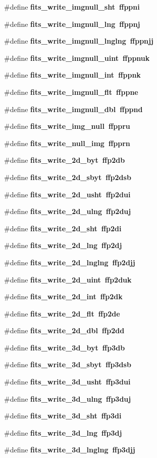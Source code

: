 \begin{CompactItemize}
\#define \bf{fits\_\-write\_\-imgnull\_\-sht}~ffppni
\item 
\#define \bf{fits\_\-write\_\-imgnull\_\-lng}~ffppnj
\item 
\#define \bf{fits\_\-write\_\-imgnull\_\-lnglng}~ffppnjj
\item 
\#define \bf{fits\_\-write\_\-imgnull\_\-uint}~ffppnuk
\item 
\#define \bf{fits\_\-write\_\-imgnull\_\-int}~ffppnk
\item 
\#define \bf{fits\_\-write\_\-imgnull\_\-flt}~ffppne
\item 
\#define \bf{fits\_\-write\_\-imgnull\_\-dbl}~ffppnd
\item 
\#define \bf{fits\_\-write\_\-img\_\-null}~ffppru
\item 
\#define \bf{fits\_\-write\_\-null\_\-img}~ffpprn
\item 
\#define \bf{fits\_\-write\_\-2d\_\-byt}~ffp2db
\item 
\#define \bf{fits\_\-write\_\-2d\_\-sbyt}~ffp2dsb
\item 
\#define \bf{fits\_\-write\_\-2d\_\-usht}~ffp2dui
\item 
\#define \bf{fits\_\-write\_\-2d\_\-ulng}~ffp2duj
\item 
\#define \bf{fits\_\-write\_\-2d\_\-sht}~ffp2di
\item 
\#define \bf{fits\_\-write\_\-2d\_\-lng}~ffp2dj
\item 
\#define \bf{fits\_\-write\_\-2d\_\-lnglng}~ffp2djj
\item 
\#define \bf{fits\_\-write\_\-2d\_\-uint}~ffp2duk
\item 
\#define \bf{fits\_\-write\_\-2d\_\-int}~ffp2dk
\item 
\#define \bf{fits\_\-write\_\-2d\_\-flt}~ffp2de
\item 
\#define \bf{fits\_\-write\_\-2d\_\-dbl}~ffp2dd
\item 
\#define \bf{fits\_\-write\_\-3d\_\-byt}~ffp3db
\item 
\#define \bf{fits\_\-write\_\-3d\_\-sbyt}~ffp3dsb
\item 
\#define \bf{fits\_\-write\_\-3d\_\-usht}~ffp3dui
\item 
\#define \bf{fits\_\-write\_\-3d\_\-ulng}~ffp3duj
\item 
\#define \bf{fits\_\-write\_\-3d\_\-sht}~ffp3di
\item 
\#define \bf{fits\_\-write\_\-3d\_\-lng}~ffp3dj
\item 
\#define \bf{fits\_\-write\_\-3d\_\-lnglng}~ffp3djj
\item 

\end{CompactItemize}
